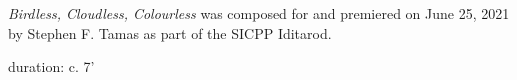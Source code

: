 \documentclass[11pt]{article}
\begin{document}
\vspace*{10\baselineskip}

\begin{center}
\textit{Birdless, Cloudless, Colourless} was composed for and premiered on June 25, 2021 by Stephen F. Tamas as part of the SICPP Iditarod.
\rightskip\leftskip
\phantom{text} \hfill \phantom{()}
\end{center}

\vspace*{26\baselineskip}

\begin{center}
duration: c. 7'
\end{center}
\end{document}
